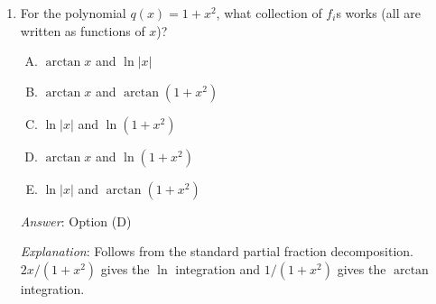 \documentclass[10pt]{amsart}
\begin{document}
\begin{enumerate}
  {\em Answer}: Option (E)

  {\em Explanation}: This can be justified in terms of partial
  fractions. Th ecase where $q$ is a product of linear factors can be
  justified using the previous question. But that is not the most
  elegant justification. When we cover sequences and series, we will
  see some comparison tests that make it clear why this holds. The
  basic example you can keep in mind is that the antiderivative of
  $1/x^2$ is $-1/x$, which has a finite limit as $x \to \infty$.

  {\em Performance review}: $4$ out of $11$ got this. $5$ chose (D),
  $1$ each chose (A) and (C).

  {\em Historical note (last year)}: $3$ out of $27$ people got this
  correct. $10$ people chose (D), $7$ people chose (C), $6$ people
  chose (B), and $1$ person chose (A).

  Those who chose (D) had the right idea but failedto account for the
  extra margin that needs to be maintained because an integration is
  being performed.

  For the remaining questions, we build on the observation: For any
  nonconstant monic polynomial $q(x)$, there exists a finite
  collection of transcendental functions $f_1, f_2, \dots, f_r$ such
  that the antiderivative of any rational function $p(x)/q(x)$, on an
  open interval where it is defined and continuous, can be expressed
  as $g_0 + f_1g_1 + f_2g_2 + \dots + f_rg_r$ where $g_0, g_1, \dots,
  g_r$ are rational functions.

\item For the polynomial $q(x) = 1 + x^2$, what collection of $f_i$s
  works (all are written as functions of $x$)?

  \begin{enumerate}[(A)]
  \item $\arctan x$ and $\ln|x|$
  \item $\arctan x$ and $\arctan(1 + x^2)$
  \item $\ln|x|$ and $\ln(1 + x^2)$ 
  \item $\arctan x$ and $\ln(1 + x^2)$
  \item $\ln|x|$ and $\arctan(1 + x^2)$
  \end{enumerate}

  {\em Answer}: Option (D)

  {\em Explanation}: Follows from the standard partial fraction
  decomposition. $2x/(1 + x^2)$ gives the $\ln$ integration and $1/(1
  + x^2)$ gives the $\arctan$ integration.


\end{enumerate}
\end{document}
